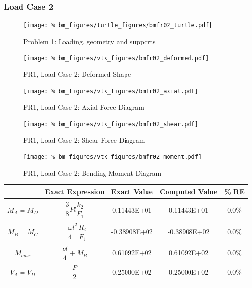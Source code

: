%
%
\clearpage
\subsubsection{Load Case 2}
\begin{figure}[h]
    \texttt{[image: \%
                            bm\_figures/turtle\_figures/bmfr02\_turtle.pdf]}
    \centering
    \caption{Problem 1: Loading, geometry and supports}
    \label{fig:bmfr02_turtle}
\end{figure}


\begin{figure}[!htb]
    \texttt{[image: \%
                     bm\_figures/vtk\_figures/bmfr02\_deformed.pdf]}
    \centering
    \caption{FR1, Load Case 2: Deformed Shape}
    \label{fig:bmfr02_deformed}
\end{figure}
\begin{figure}[!htb]
    \texttt{[image: \%
                     bm\_figures/vtk\_figures/bmfr02\_axial.pdf]}
    \centering
    \caption{FR1, Load Case 2: Axial Force Diagram}
    \label{fig:bmfr02_shear}
\end{figure}
\begin{figure}[!htb]
    \texttt{[image: \%
                     bm\_figures/vtk\_figures/bmfr02\_shear.pdf]}
    \centering
    \caption{FR1, Load Case 2: Shear Force Diagram}
    \label{fig:bmfr02_shear}
\end{figure}
\begin{figure}[!htb]
    \texttt{[image: \%
                     bm\_figures/vtk\_figures/bmfr02\_moment.pdf]}
    \centering
    \caption{FR1, Load Case 2: Bending Moment Diagram}
    \label{fig:bmfr02_moment}
\end{figure}
\begin{table}[h!]
\centering
\begin{tabular}{ c| c c c c }
    & Exact Expression & Exact Value & Computed Value & \% RE \\ \hline \\
    $M_A=M_D$   & $\dfrac{3}{8}Pl\dfrac{k_2}{F_1}$ &  0.11443E+01 & 0.11443E+01 & 0.0\% \\ \\
    $M_B=M_C$   & $\dfrac{-\omega l^2}{4}\dfrac{R_2}{F_1}$ &  -0.38908E+02 & -0.38908E+02 & 0.0\% \\ \\
    $M_{max}$   & $\dfrac{pl}{4} + M_B$ &  0.61092E+02 & 0.61092E+02 & 0.0\% \\ \\
    $V_A=V_D$   & $\dfrac{P}{2}$ &  0.25000E+02 & 0.25000E+02 & 0.0\% \\ \\
\end{tabular}
\end{table}

